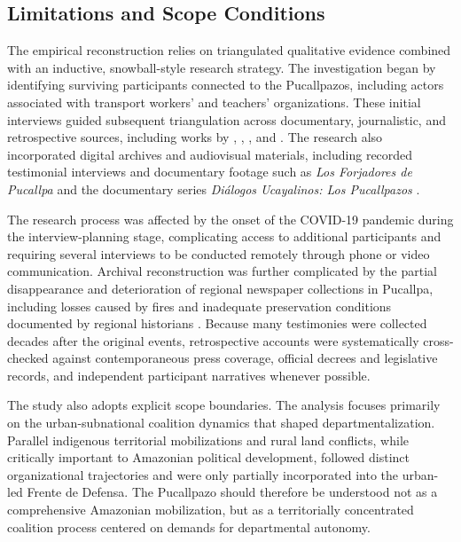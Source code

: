 \documentclass[12pt]{article}
\begin{document}
\subsection{Limitations and Scope Conditions}

The empirical reconstruction relies on triangulated qualitative evidence combined with an inductive, snowball-style research strategy. The investigation began by identifying surviving participants connected to the Pucallpazos, including actors associated with transport workers’ and teachers’ organizations. These initial interviews guided subsequent triangulation across documentary, journalistic, and retrospective sources, including works by \textcite{matos_tuesta_apuntes_2005}, \textcite{ortiz_forjadores_1962}, \textcite{rengifo_pucallpazos_2020}, and \textcite{vivanco_pimentel_gran_1997}. The research also incorporated digital archives and audiovisual materials, including recorded testimonial interviews and documentary footage such as \emph{Los Forjadores de Pucallpa} \parencite{tapuya_huaman_documental_2024} and the documentary series \emph{Diálogos Ucayalinos: Los Pucallpazos} \parencite{matos_tuesta_pucallpazos_2020,matos_tuesta_pucallpazos_2020-1,matos_tuesta_pucallpazos_2020-2}.

The research process was affected by the onset of the COVID-19 pandemic during the interview-planning stage, complicating access to additional participants and requiring several interviews to be conducted remotely through phone or video communication. Archival reconstruction was further complicated by the partial disappearance and deterioration of regional newspaper collections in Pucallpa, including losses caused by fires and inadequate preservation conditions documented by regional historians \parencite{matos_tuesta_apuntes_2005}. Because many testimonies were collected decades after the original events, retrospective accounts were systematically cross-checked against contemporaneous press coverage, official decrees and legislative records, and independent participant narratives whenever possible.

The study also adopts explicit scope boundaries. The analysis focuses primarily on the urban-subnational coalition dynamics that shaped departmentalization. Parallel indigenous territorial mobilizations and rural land conflicts, while critically important to Amazonian political development, followed distinct organizational trajectories and were only partially incorporated into the urban-led Frente de Defensa. The Pucallpazo should therefore be understood not as a comprehensive Amazonian mobilization, but as a territorially concentrated coalition process centered on demands for departmental autonomy.
\end{document}
